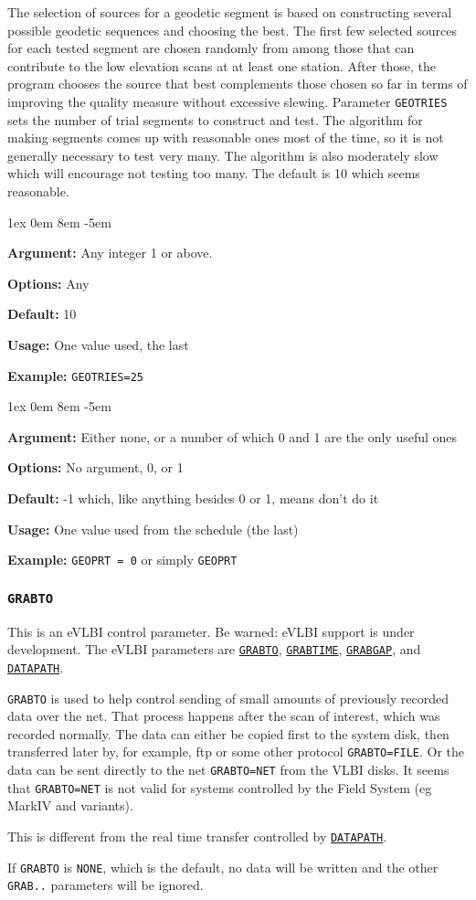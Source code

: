 \documentclass{report}
\newcommand{\rcwbox}[5]{
  \begin{list}{}{\parsep 1ex  \itemsep 0em
                 \leftmargin 8em  \itemindent -5em }
    \item {\bf Argument:} #1
    \item {\bf Options:}  #2
    \item {\bf Default:}  #3
    \item {\bf Usage:}    #4
    \item {\bf Example:}  #5
  \end{list}
}
\begin{document}
The selection of sources for a geodetic segment is based on
constructing several possible geodetic sequences and choosing the
best.  The first few selected sources for each tested segment are
chosen randomly from among those that can contribute to the low
elevation scans at at least one station.  After those, the program
chooses the source that best complements those chosen so far in
terms of improving the quality measure without excessive slewing.
Parameter {\tt GEOTRIES} sets the number of trial segments to
construct and test.  The algorithm for making segments comes up
with reasonable ones most of the time, so it is not generally
necessary to test very many.  The algorithm is also moderately
slow which will encourage not testing too many.  The default is
10 which seems reasonable.

\rcwbox
{Any integer 1 or above.}
{Any}
{10}
{One value used, the last}
{{\tt GEOTRIES=25}}


\rcwbox
{Either none, or a number of which 0 and 1 are the only useful ones}
{No argument, 0, or 1}
{-1 which, like anything besides 0 or 1, means don't do it}
{One value used from the schedule (the last)}
{{\tt GEOPRT = 0} or simply {\tt GEOPRT}}


\subsubsection{\label{MP:GRABTO}{\tt GRABTO}}

This is an eVLBI control parameter.  Be warned: eVLBI support is
under development.
The eVLBI parameters are 
{\hyperref[MP:GRABTO]{{\tt GRABTO}}},
{\hyperref[MP:GRABTIME]{{\tt GRABTIME}}}, 
{\hyperref[MP:GRABGAP]{{\tt GRABGAP}}},
and 
{\hyperref[MP:DATAPATH]{{\tt DATAPATH}}}.

{\tt GRABTO} is used to help control sending of small amounts of
previously recorded data over the net.  That process happens after the
scan of interest, which was recorded normally.  The data can either be
copied first to the system disk, then transferred later by, for
example, ftp or some other protocol {\tt GRABTO=FILE}.  Or the data
can be sent directly to the net {\tt GRABTO=NET} from the VLBI disks.
It seems that {\tt GRABTO=NET} is not valid for systems controlled by
the Field System (eg MarkIV and variants).

This is different from the real time transfer controlled by
{\hyperref[MP:DATAPATH]{{\tt DATAPATH}}}.

If {\tt GRABTO} is {\tt NONE}, which is the default, no data will be
written and the other {\tt GRAB..} parameters will be ignored.
\end{document}
